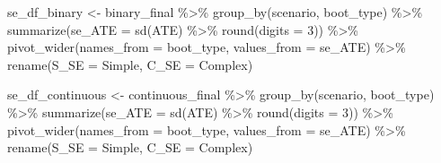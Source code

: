 \documentclass[
]{article}
\newenvironment{Shaded}{\begin{snugshade}}{\end{snugshade}}
\newcommand{\AttributeTok}[1]{\textcolor[rgb]{0.77,0.63,0.00}{#1}}
\newcommand{\DecValTok}[1]{\textcolor[rgb]{0.00,0.00,0.81}{#1}}
\newcommand{\FunctionTok}[1]{\textcolor[rgb]{0.00,0.00,0.00}{#1}}
\newcommand{\NormalTok}[1]{#1}
\newcommand{\OtherTok}[1]{\textcolor[rgb]{0.56,0.35,0.01}{#1}}
\newcommand{\SpecialCharTok}[1]{\textcolor[rgb]{0.00,0.00,0.00}{#1}}
\begin{document}
\begin{Shaded}
\begin{Highlighting}[]
\NormalTok{se\_df\_binary }\OtherTok{\textless{}{-}}
\NormalTok{  binary\_final }\SpecialCharTok{\%\textgreater{}\%}
  \FunctionTok{group\_by}\NormalTok{(scenario, boot\_type) }\SpecialCharTok{\%\textgreater{}\%}
  \FunctionTok{summarize}\NormalTok{(}\AttributeTok{se\_ATE =} \FunctionTok{sd}\NormalTok{(ATE) }\SpecialCharTok{\%\textgreater{}\%} \FunctionTok{round}\NormalTok{(}\AttributeTok{digits =} \DecValTok{3}\NormalTok{)) }\SpecialCharTok{\%\textgreater{}\%}
  \FunctionTok{pivot\_wider}\NormalTok{(}\AttributeTok{names\_from =}\NormalTok{ boot\_type, }\AttributeTok{values\_from =}\NormalTok{ se\_ATE) }\SpecialCharTok{\%\textgreater{}\%} 
  \FunctionTok{rename}\NormalTok{(}\AttributeTok{S\_SE =}\NormalTok{ Simple, }\AttributeTok{C\_SE =}\NormalTok{ Complex)}

\NormalTok{se\_df\_continuous }\OtherTok{\textless{}{-}}
\NormalTok{  continuous\_final }\SpecialCharTok{\%\textgreater{}\%}
  \FunctionTok{group\_by}\NormalTok{(scenario, boot\_type) }\SpecialCharTok{\%\textgreater{}\%}
  \FunctionTok{summarize}\NormalTok{(}\AttributeTok{se\_ATE =} \FunctionTok{sd}\NormalTok{(ATE) }\SpecialCharTok{\%\textgreater{}\%} \FunctionTok{round}\NormalTok{(}\AttributeTok{digits =} \DecValTok{3}\NormalTok{)) }\SpecialCharTok{\%\textgreater{}\%}
  \FunctionTok{pivot\_wider}\NormalTok{(}\AttributeTok{names\_from =}\NormalTok{ boot\_type, }\AttributeTok{values\_from =}\NormalTok{ se\_ATE) }\SpecialCharTok{\%\textgreater{}\%} 
  \FunctionTok{rename}\NormalTok{(}\AttributeTok{S\_SE =}\NormalTok{ Simple, }\AttributeTok{C\_SE =}\NormalTok{ Complex)}
\end{Highlighting}
\end{Shaded}
\end{document}
